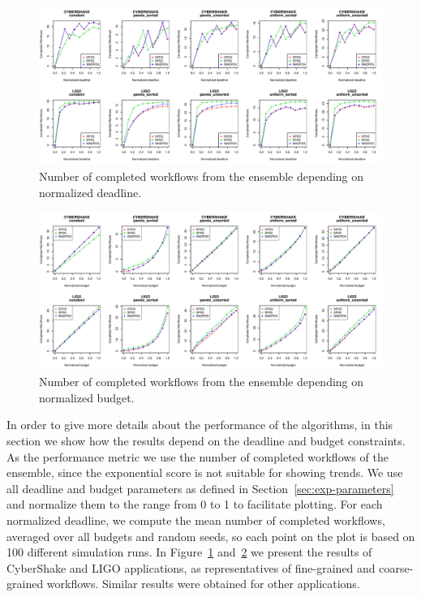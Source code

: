 \documentclass[preprint,5p]{elsarticle}
\begin{document}
\begin{figure}[htb]
    \centering
    \includegraphics[width=\textwidth]{run-finish-variations-test-0-output-deadlines-app-dist-selected}    
    \caption{Number of completed workflows from the ensemble depending on normalized deadline.}
    \label{fig:completed-deadlines}
\end{figure}
\begin{figure}[htb]
    \centering
    \includegraphics[width=\textwidth]{run-finish-variations-test-0-output-budgets-app-dist-selected}    
    \caption{Number of completed workflows from the ensemble depending on normalized budget.}
    \label{fig:completed-budgets}
\end{figure}


In order to give more details about the performance of the algorithms, in this
section we show how the results depend on the deadline and budget constraints.
As the performance metric we use the number of completed workflows of the
ensemble, since the exponential score is not suitable for showing trends.
We use all deadline and budget parameters as defined in
Section~\ref{sec:exp-parameters} and normalize them to the range from 0 to 1 to
facilitate plotting.
For each normalized deadline, we compute the mean number of completed workflows,
averaged over all budgets and random seeds, so each point on the plot is based
on 100 different simulation runs. In Figure~\ref{fig:completed-deadlines}
and~\ref{fig:completed-budgets} we present the results of CyberShake and LIGO
applications, as representatives of fine-grained and coarse-grained workflows.
Similar results were obtained for other applications.
\end{document}

